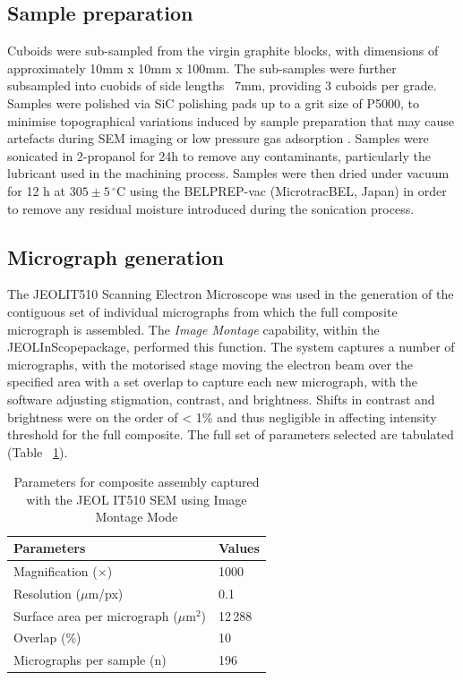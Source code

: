 \documentclass[3p,twocolumn]{elsarticle}
\begin{document}
\subsection{Sample preparation}
Cuboids were sub-sampled from the virgin graphite blocks, with dimensions of
approximately 10mm x 10mm x 100mm. The sub-samples were further subsampled into
cuobids of side lengths ~7mm, providing 3 cuboids per grade. Samples were
polished via SiC polishing pads up to a grit size of P5000, to minimise
topographical variations induced by sample preparation that may cause artefacts
during SEM imaging or low pressure gas adsorption \citep{Fang2022,Jones2018}. 
Samples were sonicated in 2-propanol for 24h to remove any contaminants,
particularly the lubricant used in the machining process. Samples were then
dried under vacuum for 12 h at $305 \pm 5\,^\circ\mathrm{C}$ using the
BELPREP-vac (MicrotracBEL, Japan) in order to remove any residual moisture
introduced during the sonication process.
\subsection{Micrograph generation}
The JEOL\texttrademark  IT510 Scanning Electron Microscope was used in the
generation of the contiguous set of individual micrographs from which the full
composite micrograph is assembled. The \textit{Image Montage} capability, within
the JEOLInScope\texttrademark package, performed this function. The system
captures a number of micrographs, with the motorised stage moving the electron
beam over the specified area with a set overlap to capture each new micrograph,
with the software adjusting stigmation, contrast, and brightness. Shifts in
contrast and brightness were on the order of < 1\%  and thus negligible in affecting intensity threshold
for the full composite. The full set of parameters selected are tabulated (Table
~\ref{tab:microscopy_parameters}).

\begin{table}
  \centering
  \caption{Parameters for composite assembly captured with the JEOL IT510 SEM using Image Montage Mode}
  \label{tab:microscopy_parameters}
    \begin{tabular}{l l}
      \hline
      Parameters & Values \\
      \hline
      Magnification ($\times$)                    & 1000 \\
      Resolution ($\mu$m/px)               & 0.1 \\
      Surface area per micrograph ($\mu$m$^2$) & 12\,288 \\
      Overlap (\%)                          & 10 \\
      Micrographs per sample (n)            & 196 \\
      \hline
    \end{tabular}%
\end{table}
\end{document}

